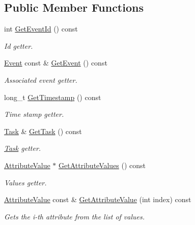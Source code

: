 \subsection*{Public Member Functions}
\begin{DoxyCompactItemize}
\item 
int \hyperlink{class_model_1_1_event_record_ab1145e8722fedee49238ff1a6405be42}{Get\-Event\-Id} () const 
\begin{DoxyCompactList}\small\item\em Id getter. \end{DoxyCompactList}\item 
\hyperlink{class_model_1_1_event}{Event} const \& \hyperlink{class_model_1_1_event_record_a3d66d97ef8974c34bd185ccf673f20cc}{Get\-Event} () const 
\begin{DoxyCompactList}\small\item\em Associated event getter. \end{DoxyCompactList}\item 
long\-\_\-t \hyperlink{class_model_1_1_event_record_a7417afb1ef1f92ef77041cb6f1d91b02}{Get\-Timestamp} () const 
\begin{DoxyCompactList}\small\item\em Time stamp getter. \end{DoxyCompactList}\item 
\hyperlink{class_model_1_1_task}{Task} \& \hyperlink{class_model_1_1_event_record_a2b47dc5a78e03c3b2208f4621529dd5a}{Get\-Task} () const 
\begin{DoxyCompactList}\small\item\em \hyperlink{class_model_1_1_task}{Task} getter. \end{DoxyCompactList}\item 
\hyperlink{class_common_1_1_attribute_value}{Attribute\-Value} $\ast$ \hyperlink{class_model_1_1_event_record_a98f4c816d126df0b8b0e844a22265ebf}{Get\-Attribute\-Values} () const 
\begin{DoxyCompactList}\small\item\em Values getter. \end{DoxyCompactList}\item 
\hyperlink{class_common_1_1_attribute_value}{Attribute\-Value} const \& \hyperlink{class_model_1_1_event_record_a383b3d1ef44052fabab08df8bb634c31}{Get\-Attribute\-Value} (int index) const 
\begin{DoxyCompactList}\small\item\em Gets the i-\/th attribute from the list of values. \end{DoxyCompactList}\end{DoxyCompactItemize}
